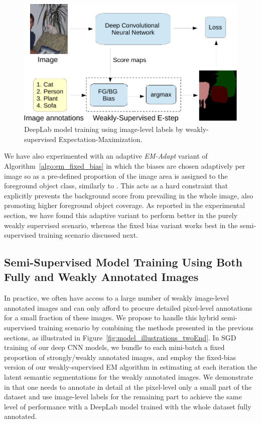 \begin{figure}[htbp!]
  \centering
  \includegraphics[width=0.9\linewidth]{fig/model_train_image.pdf} 
  \caption{DeepLab model training using image-level labels by
    weakly-supervised Expectation-Maximization.}
  \label{fig:model_train_image}
\end{figure}

We have also experimented with an adaptive \textsl{EM-Adapt} variant of
Algorithm~\ref{algo:em_fixed_bias} in which the biases are chosen
adaptively per image so as a pre-defined proportion of the image area
is assigned to the foreground object class, similarly to
\citet{kuck2005individuals}. This acts as a hard constraint that
explicitly prevents the background score from prevailing in the whole
image, also promoting higher foreground object coverage. As reported
in the experimental section, we have found this adaptive variant to
perform better in the purely weakly supervised scenario, whereas the
fixed bias variant works best in the semi-supervised training scenario
discussed next.

\subsection{Semi-Supervised Model Training Using Both Fully and Weakly Annotated Images}
\label{sec:train_semi}

In practice, we often have access to a large number of weakly
image-level annotated images and can only afford to procure detailed
pixel-level annotations for a small fraction of these images. We
propose to handle this hybrid semi-supervised training scenario by
combining the methods presented in the previous sections, as
illustrated in Figure~\ref{fig:model_illustrations_twoEnd}. In SGD
training of our deep CNN models, we bundle to each mini-batch a fixed
proportion of strongly/weakly annotated images, and employ the
fixed-bias version of our weakly-supervised EM algorithm in estimating
at each iteration the latent semantic segmentations for the weakly
annotated images. We demonstrate in  that one
needs to annotate in detail at the pixel-level only a small part of
the dataset and use image-level labels for the remaining part to
achieve the same level of performance with a DeepLab model trained
with the whole dataset fully annotated.

